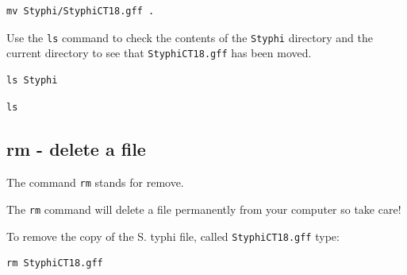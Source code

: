 \documentclass[11pt]{article}
\makeatletter
\newcommand{\boxspacing}{\kern\kvtcb@left@rule\kern\kvtcb@boxsep}
\newcommand{\prompt}[4]{
        {\ttfamily\llap{{\color{blue}\LARGE\faKeyboardO\hspace{3pt}#4}}\vspace{-\baselineskip}}
    }
\makeatother
\begin{document}
    \begin{tcolorbox}[breakable, size=fbox, boxrule=1pt, pad at break*=1mm,colback=cellbackground, colframe=cellborder]
\prompt{In}{incolor}{ }{\boxspacing}
\begin{Verbatim}[commandchars=\\\{\}]
mv Styphi/StyphiCT18.gff .
\end{Verbatim}
\end{tcolorbox}

    Use the \texttt{ls} command to check the contents of the \texttt{Styphi}
directory and the current directory to see that \texttt{StyphiCT18.gff}
has been moved.

    \begin{tcolorbox}[breakable, size=fbox, boxrule=1pt, pad at break*=1mm,colback=cellbackground, colframe=cellborder]
\prompt{In}{incolor}{ }{\boxspacing}
\begin{Verbatim}[commandchars=\\\{\}]
ls Styphi
\end{Verbatim}
\end{tcolorbox}

    \begin{tcolorbox}[breakable, size=fbox, boxrule=1pt, pad at break*=1mm,colback=cellbackground, colframe=cellborder]
\prompt{In}{incolor}{ }{\boxspacing}
\begin{Verbatim}[commandchars=\\\{\}]
ls
\end{Verbatim}
\end{tcolorbox}

    \hypertarget{rm---delete-a-file}{%
\subsection{rm - delete a file}\label{rm---delete-a-file}}

The command \texttt{rm} stands for remove.

The \texttt{rm} command will delete a file permanently from your
computer so take care!

To remove the copy of the S. typhi file, called \texttt{StyphiCT18.gff}
type:

    \begin{tcolorbox}[breakable, size=fbox, boxrule=1pt, pad at break*=1mm,colback=cellbackground, colframe=cellborder]
\prompt{In}{incolor}{ }{\boxspacing}
\begin{Verbatim}[commandchars=\\\{\}]
rm StyphiCT18.gff
\end{Verbatim}
\end{tcolorbox}
\end{document}
